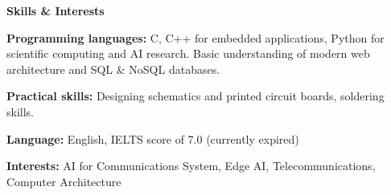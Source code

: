 \documentclass[11pt]{article}
\begin{document}
\begin{center}
    \textbf{Skills \& Interests  }
\end{center}

\textbf{Programming languages:} C, C++ for embedded applications, Python for scientific computing and AI research. Basic understanding of modern web architecture and SQL \& NoSQL databases.

\textbf{Practical skills:} Designing schematics and printed circuit boards, soldering skills. 


\textbf{Language:} English, IELTS score of 7.0 (currently expired)

\textbf{Interests:} AI for Communications System, Edge AI, Telecommunications, Computer Architecture
\end{document}
